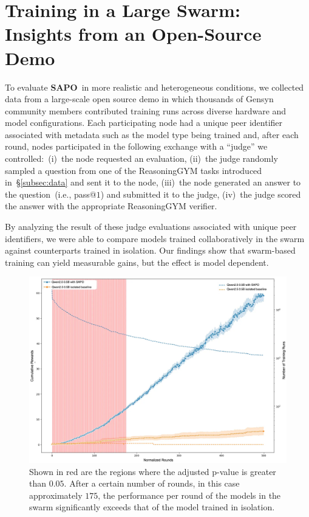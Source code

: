 \documentclass[11pt, a4paper, logo, singlecolumn, copyright]{gensyn}
\newcommand{\SAPO}{\textbf{SAPO}}
\begin{document}
\section{Training in a Large Swarm: Insights from an Open-Source Demo}
\label{par:training_in_large_swarm}
To evaluate \SAPO~in more realistic and heterogeneous conditions, we collected data from a large-scale open source demo in which thousands of Gensyn community members contributed training runs across diverse hardware and model configurations. Each participating node had a unique peer identifier associated with metadata such as the model type being trained and, after each round, nodes participated in the following exchange with a ``judge'' we controlled:~(i)~the node requested an evaluation, (ii)~the judge randomly sampled a question from one of the ReasoningGYM tasks introduced in~\S\ref{subsec:data} and sent it to the node, (iii)~the node generated an answer to the question~(i.e., pass@$1$) and submitted it to the judge, (iv)~the judge scored the answer with the appropriate ReasoningGYM verifier.

By analyzing the result of these judge evaluations associated with unique peer identifiers, we were able to compare models trained collaboratively in the swarm against counterparts trained in isolation. Our findings show that swarm-based training can yield measurable gains, but the effect is model dependent. 

\begin{figure}[htbp!]
	\centering
	\includegraphics[width=\textwidth]{figures/sapo-Page-1.drawio.png}
	\caption{Shown in red are the regions where the adjusted p-value is greater than $0.05$.  After a certain number of rounds, in this case approximately $175$, the performance per round of the models in the swarm significantly exceeds that of the model trained in isolation.}
	\label{fig:demo}
\end{figure}
\end{document}
